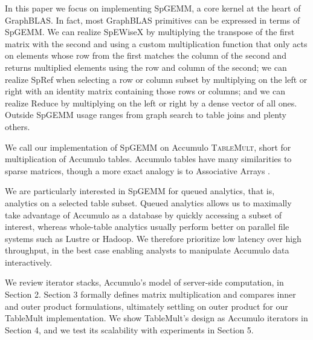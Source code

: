 In this paper we focus on implementing SpGEMM, a core kernel at the heart of GraphBLAS.
In fact, most GraphBLAS primitives can be expressed in terms of SpGEMM.
We can realize SpEWiseX by multiplying the transpose of the first matrix with the second
and using a custom multiplication function that only acts on elements whose row from the first 
matches the column of the second and returns multiplied elements using the row and column of the second;
we can realize SpRef when selecting a row or column subset by multiplying on the left or right with an identity matrix 
containing those rows or columns;
and we can realize Reduce by multiplying on the left or right %
by a dense vector of all ones.
Outside SpGEMM usage ranges from graph search \cite{kepner2011graph} to table joins \cite{cohen2009mad} 
and plenty others.

We call our implementation of SpGEMM on Accumulo \textsc{TableMult}, short for multiplication of Accumulo tables.
Accumulo tables have many similarities to sparse matrices, though a more exact analogy is to Associative Arrays 
\cite{kepner2014gabb}.

We are particularly interested in SpGEMM for queued analytics, that is, analytics on a selected table subset.  
Queued analytics allows us to maximally take advantage of Accumulo as a database 
by quickly accessing a subset of interest, 
whereas whole-table analytics usually perform better on parallel file systems such as Lustre or Hadoop.
We therefore prioritize low latency over high throughput, %
in the best case enabling analysts to manipulate Accumulo data interactively.


We review iterator stacks, Accumulo's model of server-side computation, in Section 2.
Section 3 formally defines matrix multiplication and compares inner and outer product formulations,
ultimately settling on outer product for our TableMult implementation.
We show TableMult's design as Accumulo iterators in Section 4,
and we test its scalability with experiments in Section 5.










